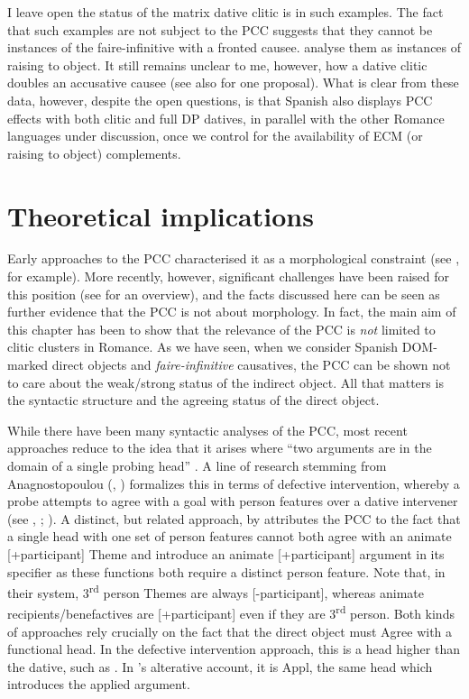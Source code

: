 \documentclass[output=paper,colorlinks,citecolor=brown,nonflat]{./langscibook}
\begin{document}
I leave open the status of the matrix dative clitic is in such examples. The fact that such examples are not subject to the PCC suggests that they cannot be instances of the faire-infinitive with a fronted causee. \citet{OrmazabalRomero2013Borealis} analyse them as instances of raising to object. It still remains unclear to me, however, how a dative clitic doubles an accusative causee (see also \citealt{OrdóñezSaab2017} for one proposal). What is clear from these data, however, despite the open questions, is that Spanish also displays PCC effects with both clitic and full DP datives, in parallel with the other Romance languages under discussion, once we control for the availability of ECM (or raising to object) complements.

\section{Theoretical implications}\label{sec:sheehan:5}

Early approaches to the PCC characterised it as a morphological constraint (see \citealt{Bonet1991}, for example). More recently, however, significant challenges have been raised for this position (see \citealt{Preminger2019} for an overview), and the facts discussed here can be seen as further evidence that the PCC is not about morphology. In fact, the main aim of this chapter has been to show that the relevance of the PCC is \textit{not} limited to clitic clusters in Romance. As we have seen, when we consider Spanish DOM-marked direct objects and \textit{faire-infinitive} causatives, the PCC can be shown not to care about the weak/strong status of the indirect object. All that matters is the syntactic structure and the agreeing status of the direct object. 

While there have been many syntactic analyses of the PCC, most recent approaches reduce to the idea that it arises where “two arguments are in the domain of a single probing head” \citep[290]{Nevins2007}. A line of research stemming from Anagnostopoulou (\citeyear{Anagnostopoulou2003}, \citeyear{Anagnostopoulou2005}) formalizes this in terms of defective intervention, whereby a probe attempts to agree with a goal with person features over a dative intervener (see \citealt{Anagnostopoulou2003}, \citeyear{Anagnostopoulou2005}; \citealt{Nevins2007, Rezac2008, Preminger2019}). A distinct, but related approach, by \citet{AdgerHarbour2007} attributes the PCC to the fact that a single head with one set of person features cannot both agree with an animate [+participant] Theme and introduce an animate [+participant] argument in its specifier as these functions both require a distinct person feature. Note that, in their system, 3\textsuperscript{rd} person Themes are always [-participant], whereas animate recipients/benefactives are [+participant] even if they are 3\textsuperscript{rd} person.  Both kinds of approaches rely crucially on the fact that the direct object must Agree with a functional head. In the defective intervention approach, this is a head higher than the dative, such as \liv . In \citeauthor{AdgerHarbour2007}’s alterative account, it is Appl, the same head which introduces the applied argument. 
\end{document}
